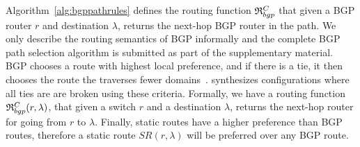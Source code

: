  \iffull
Algorithm~\ref{alg:bgppathrules} defines the routing function 
$\mathfrak{R}_{bgp}^C$ 
that given 
a BGP router $r$
and destination  
$\lambda$,
returns 
the next-hop BGP router in the path. 
\else
We only describe the routing semantics of BGP
informally and the complete BGP path selection algorithm is submitted as part of the supplementary material.
\fi
BGP 
chooses a route with highest local preference, and
if there is a tie, it then chooses the route the traverses fewer domains~\cite{bgp}. 
\name synthesizes configurations where all ties are 
are broken using these criteria. Formally, we have a routing function 
$\mathfrak{R}_{bgp}^C(r,\lambda)$, that given a switch $r$ and a destination $\lambda$,
returns the next-hop router for going from $r$ to $\lambda$. 
Finally, static routes 
have a higher preference than BGP routes, therefore a static route
$SR(r, \lambda)$ will be preferred over any BGP route.

